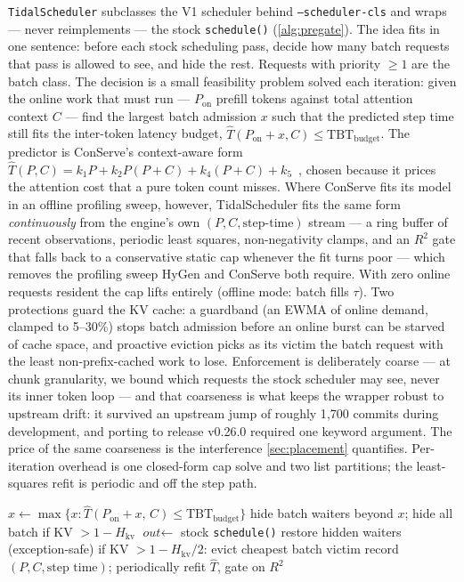 \documentclass[11pt]{article}
\newcommand{\code}[1]{\texttt{#1}}
\begin{document}
\code{TidalScheduler} subclasses the V1 scheduler behind \code{--scheduler-cls} and
wraps --- never reimplements --- the stock \code{schedule()} (\cref{alg:pregate}). The
idea fits in one sentence: before each stock scheduling pass, decide how many batch
requests that pass is allowed to see, and hide the rest. Requests with priority
$\ge 1$ are the batch class. The decision is a small feasibility problem solved each
iteration: given the online work that must run --- $P_{\mathrm{on}}$ prefill tokens
against total attention context $C$ --- find the largest batch admission $x$ such that
the predicted step time still fits the inter-token latency budget,
$\hat{T}(P_{\mathrm{on}} + x, C) \le \mathrm{TBT}_{\mathrm{budget}}$. The predictor is
ConServe's context-aware form $\hat{T}(P,C) = k_1 P + k_2 P(P{+}C) + k_4 (P{+}C) +
k_5$~\citep{conserve}, chosen because it prices the attention cost that a pure token
count misses. Where ConServe fits its model in an offline profiling sweep, however,
TidalScheduler fits the same form \emph{continuously} from the engine's own
$(P, C, \text{step-time})$ stream --- a ring buffer of recent observations, periodic
least squares, non-negativity clamps, and an $R^2$ gate that falls back to a
conservative static cap whenever the fit turns poor --- which removes the profiling
sweep HyGen and ConServe both require. With zero online requests resident the cap
lifts entirely (offline mode: batch fills $\tau$). Two protections guard the KV cache:
a guardband (an EWMA of online demand, clamped to 5--30\%) stops batch admission before
an online burst can be starved of cache space, and proactive eviction picks as its
victim the batch request with the least non-prefix-cached work to lose. Enforcement is
deliberately coarse --- at chunk granularity, we bound which requests the stock
scheduler may see, never its inner token loop --- and that coarseness is what keeps the
wrapper robust to upstream drift: it survived an upstream jump of roughly 1{,}700
commits during development, and porting to release v0.26.0 required one keyword
argument. The price of the same coarseness is the interference \cref{sec:placement}
quantifies. Per-iteration overhead is one closed-form cap solve and two list
partitions; the least-squares refit is periodic and off the step path.

\begin{algorithm}[t]
\caption{TidalScheduler pre-gate (one iteration)}
\label{alg:pregate}
\begin{algorithmic}[1]
\State $x \gets \max\{x : \hat{T}(P_{\mathrm{on}}{+}x,\,C) \le \mathrm{TBT}_{\mathrm{budget}}\}$
\State hide batch waiters beyond $x$; hide all batch if KV $> 1{-}H_{\mathrm{kv}}$
\State $\textit{out} \gets$ stock \code{schedule()}
\State restore hidden waiters (exception-safe)
\State if KV $> 1 - H_{\mathrm{kv}}/2$: evict cheapest batch victim
\State record $(P, C, \text{step time})$; periodically refit $\hat{T}$, gate on $R^2$
\end{algorithmic}
\end{algorithm}
\end{document}
